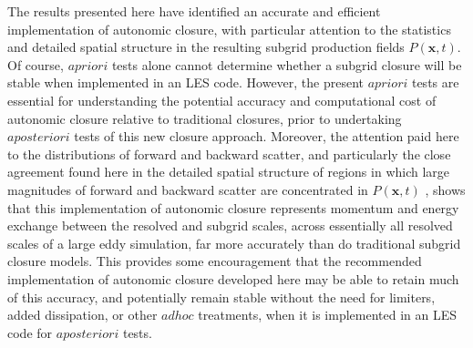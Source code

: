The results presented here have identified an accurate and efficient implementation of autonomic closure, with particular attention to the statistics and detailed spatial structure in the resulting subgrid production fields $P(\mathbf{x},t)$. Of course, $a priori$ tests alone cannot determine whether a subgrid closure will be stable when implemented in an LES code. However, the present $a priori$ tests are essential for understanding the potential accuracy and computational cost of autonomic closure relative to traditional closures, prior to undertaking $a posteriori$ tests of this new closure approach. Moreover, the attention paid here to the distributions of forward and backward scatter, and particularly the close agreement found here in the detailed spatial structure of regions in which large magnitudes of forward and backward scatter are concentrated in $P(\mathbf{x},t)$ , shows that this implementation of autonomic closure represents momentum and energy exchange between the resolved and subgrid scales, across essentially all resolved scales of a large eddy simulation, far more accurately than do traditional subgrid closure models. This provides some encouragement that the recommended implementation of autonomic closure developed here may be able to retain much of this accuracy, and potentially remain stable without the need for limiters, added dissipation, or other $ad hoc$ treatments, when it is implemented in an LES code for $a posteriori$ tests.
